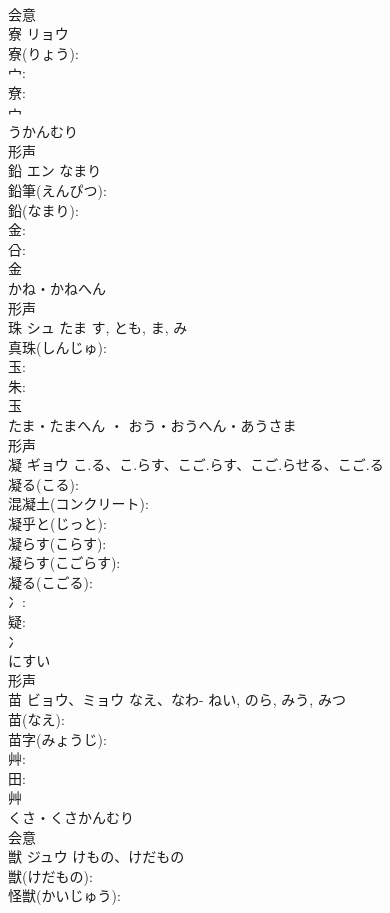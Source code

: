 \documentclass[8pt]{extreport}
\begin{document}
\begin{CJK}{UTF8}{min}
\\	会意 
\\	寮	リョウ			
\\	寮(りょう): 
\\	宀: 
\\	尞: 
\\	宀	
\\	うかんむり	
\\	形声 
\\	鉛	エン	なまり		
\\	鉛筆(えんぴつ): 
\\	鉛(なまり): 
\\	金: 
\\	㕣: 
\\	金	
\\	かね・かねへん	
\\	形声 
\\	珠	シュ	たま	す, とも, ま, み	
\\	真珠(しんじゅ): 
\\	玉: 
\\	朱: 
\\	玉	
\\	たま・たまへん ・ おう・おうへん・あうさま	
\\	形声 
\\	凝	ギョウ	こ.る、こ.らす、こご.らす、こご.らせる、こご.る		
\\	凝る(こる): 
\\	混凝土(コンクリート): 
\\	凝乎と(じっと): 
\\	凝らす(こらす): 
\\	凝らす(こごらす): 
\\	凝る(こごる): 
\\	冫: 
\\	疑: 
\\	冫	
\\	にすい	
\\	形声 
\\	苗	ビョウ、ミョウ	なえ、なわ-	ねい, のら, みう, みつ	
\\	苗(なえ): 
\\	苗字(みょうじ): 
\\	艸: 
\\	田: 
\\	艸	
\\	くさ・くさかんむり	
\\	会意 
\\	獣	ジュウ	けもの、けだもの		
\\	獣(けだもの): 
\\	怪獣(かいじゅう): 

\end{CJK}
\end{document}
